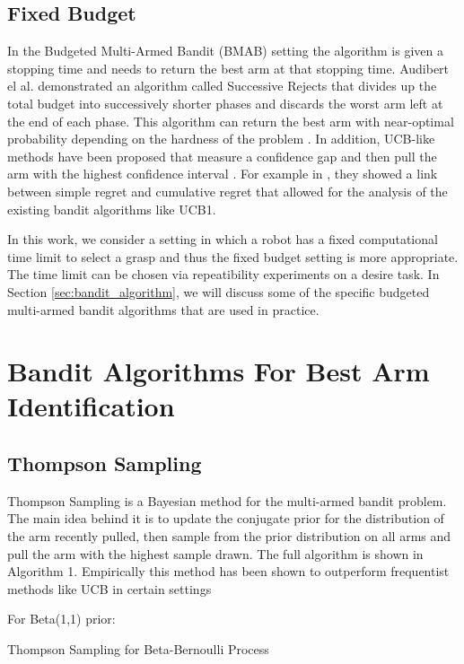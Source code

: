 \documentclass[letterpaper, 10 pt, conference]{ieeeconf}  %
\begin{document}
\subsection{Fixed Budget}
In the Budgeted Multi-Armed Bandit (BMAB) setting the algorithm is given a stopping time and needs to return the best arm at that stopping time. Audibert el al. demonstrated an algorithm called Successive Rejects that divides up the total budget into successively shorter phases and discards the worst arm left at the end of each phase. This algorithm can return the best arm with near-optimal probability depending on the hardness of the problem \cite{audibert2010best}. In addition, UCB-like methods have been proposed that measure a confidence gap and then pull the arm with the highest confidence interval \cite{gabillon2012best}. For example in \cite{bubeck2009pure}, they showed a link between simple regret and cumulative regret that allowed for the analysis of the existing bandit algorithms like UCB1.

In this work, we consider a setting in which a robot has a fixed computational time limit to select a grasp and thus the fixed budget setting is more appropriate. The time limit can be chosen via repeatibility experiments on a desire task. In Section \ref{sec:bandit_algorithm}, we will discuss some of the specific budgeted multi-armed bandit algorithms that are used in practice. 

\label{sec:bandit_algorithm}
\section{Bandit Algorithms For Best Arm Identification}\label{sec:algorithms}
\subsection{Thompson Sampling}
Thompson Sampling is a Bayesian method for the multi-armed bandit problem. The main idea behind it is to update the conjugate prior for the distribution of the arm recently pulled, then sample from the prior distribution on all arms and pull the arm with the highest sample drawn. The full algorithm is shown in Algorithm 1.  Empirically this method has been shown to outperform frequentist methods like UCB in certain settings \cite{chapelle2011empirical} 

\begin{algorithm}
 For Beta(1,1) prior: \\
 \caption{Thompson Sampling for Beta-Bernoulli Process}
\end{algorithm}
\end{document}
